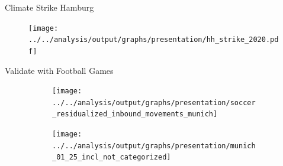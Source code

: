 \documentclass[usenames,dvipsnames]{beamer} %
\begin{document}


\begin{frame}{Climate Strike Hamburg}
	\begin{figure}
		\texttt{[image: ../../analysis/output/graphs/presentation/hh\_strike\_2020.pdf]}
	\end{figure}
\end{frame}





\begin{frame}{Validate with Football Games}
	\begin{figure}
		\begin{subfigure}[h]{0.44\linewidth}\centering
			\texttt{[image: ../../analysis/output/graphs/presentation/soccer\_residualized\_inbound\_movements\_munich]}
		\end{subfigure}
		\begin{subfigure}[h]{0.54\linewidth}\centering
			\texttt{[image: ../../analysis/output/graphs/presentation/munich\_01\_25\_incl\_not\_categorized]}
		\end{subfigure}
	\end{figure}
\end{frame}
\end{document}
